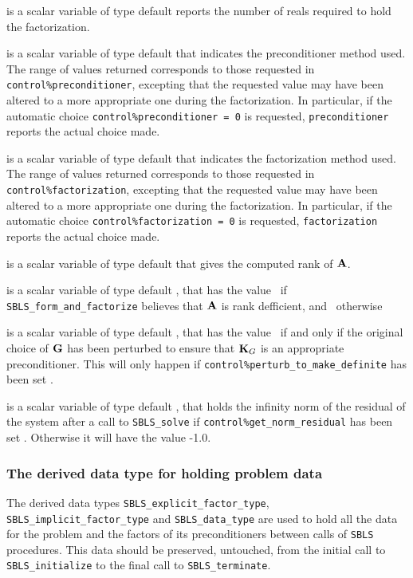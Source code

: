 \documentclass{galahad}
\newcommand{\packagename}{SBLS}
\begin{document}
\begin{description}
 is a scalar variable of type default \integer
reports the number of reals required to hold the factorization.

 is a scalar variable of type default \integer
that indicates the preconditioner method used. The range of values returned
corresponds to those requested in {\tt control\%preconditioner},
excepting that the requested value may have been altered to a more
appropriate one during the factorization. In particular, if the automatic
choice {\tt control\%preconditioner = 0} is requested,
{\tt preconditioner} reports the actual choice made.

 is a scalar variable of type default \integer
that indicates the factorization method used. The range of values returned
corresponds to those requested in {\tt control\%factorization},
excepting that the requested value may have been altered to a more
appropriate one during the factorization.
In particular, if the automatic
choice {\tt control\%factorization = 0} is requested,
{\tt factorization} reports the actual choice made.

 is a scalar variable of type default \integer that gives the
computed rank of ${\mathbf{A}}$.

 is a scalar variable of type default \logical, that has the
value \true\ if {\tt \packagename\_form\_and\_factorize} believes that
${\mathbf{A}}$ is rank defficient, and \false\ otherwise

 is a scalar variable of type default \logical, that has the
value \true\ if and only if the original choice of ${\mathbf{G}}$ has been perturbed to
ensure that ${\mathbf{K}}_G$ is an appropriate preconditioner. This will only
happen if {\tt control\-\%perturb\_to\_make\_definite} has been set \true.

 is a scalar variable of type default \realdp,
that holds the infinity norm of the residual of the system 
after a call to {\tt \packagename\_solve} if {\tt control\%get\_norm\_residual}
has been set \true. Otherwise it will have the value -1.0.

\end{description}


\subsubsection{The derived data type for holding problem data}\label{typedata}
The derived data types
{\tt \packagename\_explicit\_factor\_type},
{\tt \packagename\_implicit\_factor\_type} and
{\tt \packagename\_data\_type}
are used to hold all the data for the problem and the factors of
its preconditioners between calls of
{\tt \packagename} procedures.
This data should be preserved, untouched, from the initial call to
{\tt \packagename\_initialize}
to the final call to
{\tt \packagename\_terminate}.
\end{document}
